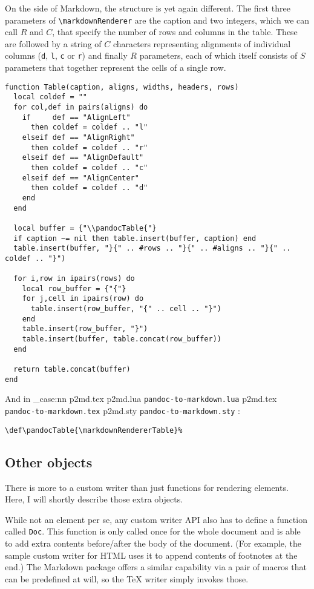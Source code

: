 \documentclass[
  digital,     %
  oneside,     %
  nosansbold,  %
  nocolorbold, %
  lof,         %
  nolot,       %
]{fithesis4}
\newcommand\macro[1]{\texttt{\textbackslash{}{#1}}}
\newcommand\renderer[1]{\macro{markdown\-Renderer\-{#1}}}
\newcommand\file[1]
  {
    \str_case:nn
      { #1 }
      {
        { p2md.lua } { \texttt{pandoc\hyp{}to\hyp{}markdown.lua} }
        { p2md.tex } { \texttt{pandoc\hyp{}to\hyp{}markdown.tex} }
        { p2md.sty } { \texttt{pandoc\hyp{}to\hyp{}markdown.sty} }
      }
  }
\begin{document}
On the side of Markdown, the structure is yet again different. The first three parameters of \renderer{Table} are the caption and two integers, which we can call $R$ and $C$, that specify the number of rows and columns in the table. These are followed by a string of $C$ characters representing alignments of individual columns (\texttt{d}, \texttt{l}, \texttt{c} or \texttt{r}) and finally $R$ parameters, each of which itself consists of $S$ parameters that together represent the cells of a single row.

\noindent
\lstset{language=[5.3]Lua}
\begin{lstlisting}
function Table(caption, aligns, widths, headers, rows)
  local coldef = ""
  for col,def in pairs(aligns) do
    if     def == "AlignLeft"
      then coldef = coldef .. "l"
    elseif def == "AlignRight"
      then coldef = coldef .. "r"
    elseif def == "AlignDefault"
      then coldef = coldef .. "c"
    elseif def == "AlignCenter"
      then coldef = coldef .. "d"
    end
  end

  local buffer = {"\\pandocTable{"}
  if caption ~= nil then table.insert(buffer, caption) end
  table.insert(buffer, "}{" .. #rows .. "}{" .. #aligns .. "}{" .. coldef .. "}")

  for i,row in ipairs(rows) do
    local row_buffer = {"{"}
    for j,cell in ipairs(row) do
      table.insert(row_buffer, "{" .. cell .. "}")
    end
    table.insert(row_buffer, "}")
    table.insert(buffer, table.concat(row_buffer))
  end

  return table.concat(buffer)
end
\end{lstlisting}

\noindent
And in \file{p2md.tex}:

\noindent
\lstset{language=[plain]TeX}
\begin{lstlisting}
\def\pandocTable{\markdownRendererTable}%
\end{lstlisting}

\subsection{Other objects}
There is more to a custom writer than just functions for rendering elements. Here, I will shortly describe those extra objects.

While not an element per se, any custom writer API also has to define a function called \texttt{Doc}. This function is only called once for the whole document and is able to add extra contents before/after the body of the document. (For example, the sample custom writer for HTML uses it to append contents of footnotes at the end.) The Markdown package offers a similar capability via a pair of macros that can be predefined at will, so the \TeX{} writer simply invokes those.
\end{document}

